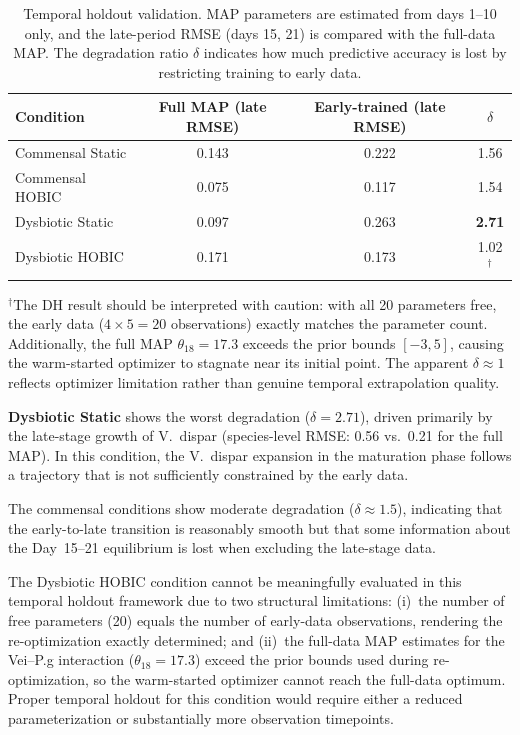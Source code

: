 \documentclass[11pt,a4paper]{article}
\begin{document}
\begin{table}[H]
\centering
\caption{Temporal holdout validation. MAP parameters are estimated from days 1--10 only, and the late-period RMSE (days 15, 21) is compared with the full-data MAP. The degradation ratio $\delta$ indicates how much predictive accuracy is lost by restricting training to early data.}
\begin{tabular}{l c c c}
\toprule
Condition & Full MAP (late RMSE) & Early-trained (late RMSE) & $\delta$ \\
\midrule
Commensal Static & 0.143 & 0.222 & 1.56 \\
Commensal HOBIC  & 0.075 & 0.117 & 1.54 \\
Dysbiotic Static & 0.097 & 0.263 & \textbf{2.71} \\
Dysbiotic HOBIC  & 0.171 & 0.173 & 1.02$^{\dagger}$ \\
\bottomrule
\end{tabular}
\begin{flushleft}
\footnotesize{$^{\dagger}$The DH result should be interpreted with caution: with all 20 parameters free, the early data ($4 \times 5 = 20$ observations) exactly matches the parameter count. Additionally, the full MAP $\theta_{18} = 17.3$ exceeds the prior bounds $[-3, 5]$, causing the warm-started optimizer to stagnate near its initial point. The apparent $\delta \approx 1$ reflects optimizer limitation rather than genuine temporal extrapolation quality.}
\end{flushleft}
\label{tab:early_late}
\end{table}

\textbf{Dysbiotic Static} shows the worst degradation ($\delta = 2.71$), driven primarily by the late-stage growth of V.~dispar (species-level RMSE: 0.56 vs.\ 0.21 for the full MAP). In this condition, the V.~dispar expansion in the maturation phase follows a trajectory that is not sufficiently constrained by the early data.

The commensal conditions show moderate degradation ($\delta \approx 1.5$), indicating that the early-to-late transition is reasonably smooth but that some information about the Day~15--21 equilibrium is lost when excluding the late-stage data.

The Dysbiotic HOBIC condition cannot be meaningfully evaluated in this temporal holdout framework due to two structural limitations: (i)~the number of free parameters (20) equals the number of early-data observations, rendering the re-optimization exactly determined; and (ii)~the full-data MAP estimates for the Vei--P.g interaction ($\theta_{18} = 17.3$) exceed the prior bounds used during re-optimization, so the warm-started optimizer cannot reach the full-data optimum. Proper temporal holdout for this condition would require either a reduced parameterization or substantially more observation timepoints.
\end{document}
